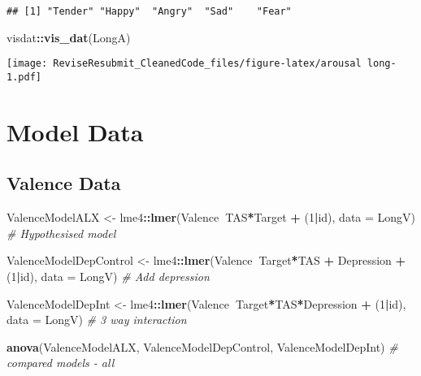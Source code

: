\documentclass[]{article}
\newenvironment{Shaded}{\begin{snugshade}}{\end{snugshade}}
\newcommand{\CommentTok}[1]{\textcolor[rgb]{0.56,0.35,0.01}{\textit{#1}}}
\newcommand{\DataTypeTok}[1]{\textcolor[rgb]{0.13,0.29,0.53}{#1}}
\newcommand{\DecValTok}[1]{\textcolor[rgb]{0.00,0.00,0.81}{#1}}
\newcommand{\KeywordTok}[1]{\textcolor[rgb]{0.13,0.29,0.53}{\textbf{#1}}}
\newcommand{\NormalTok}[1]{#1}
\newcommand{\OperatorTok}[1]{\textcolor[rgb]{0.81,0.36,0.00}{\textbf{#1}}}
\newcommand{\StringTok}[1]{\textcolor[rgb]{0.31,0.60,0.02}{#1}}
\begin{document}
\begin{verbatim}
## [1] "Tender" "Happy"  "Angry"  "Sad"    "Fear"
\end{verbatim}

\begin{Shaded}
\begin{Highlighting}[]
\NormalTok{visdat}\OperatorTok{::}\KeywordTok{vis_dat}\NormalTok{(LongA)}
\end{Highlighting}
\end{Shaded}

\texttt{[image: ReviseResubmit\_CleanedCode\_files/figure-latex/arousal long-1.pdf]}

\hypertarget{model-data}{%
\section{Model Data}\label{model-data}}

\hypertarget{valence-data}{%
\subsection{Valence Data}\label{valence-data}}

\begin{Shaded}
\begin{Highlighting}[]
\NormalTok{ValenceModelALX <-}\StringTok{ }\NormalTok{lme4}\OperatorTok{::}\KeywordTok{lmer}\NormalTok{(Valence}\OperatorTok{~}\NormalTok{TAS}\OperatorTok{*}\NormalTok{Target }\OperatorTok{+}\StringTok{ }\NormalTok{(}\DecValTok{1}\OperatorTok{|}\NormalTok{id), }\DataTypeTok{data =}\NormalTok{ LongV) }\CommentTok{# Hypothesised model }

\NormalTok{ValenceModelDepControl <-}\StringTok{ }\NormalTok{lme4}\OperatorTok{::}\KeywordTok{lmer}\NormalTok{(Valence}\OperatorTok{~}\NormalTok{Target}\OperatorTok{*}\NormalTok{TAS }\OperatorTok{+}\StringTok{ }\NormalTok{Depression }\OperatorTok{+}\StringTok{ }\NormalTok{(}\DecValTok{1}\OperatorTok{|}\NormalTok{id), }\DataTypeTok{data =}\NormalTok{ LongV) }\CommentTok{# Add depression}

\NormalTok{ValenceModelDepInt <-}\StringTok{ }\NormalTok{lme4}\OperatorTok{::}\KeywordTok{lmer}\NormalTok{(Valence}\OperatorTok{~}\NormalTok{Target}\OperatorTok{*}\NormalTok{TAS}\OperatorTok{*}\NormalTok{Depression }\OperatorTok{+}\StringTok{ }\NormalTok{(}\DecValTok{1}\OperatorTok{|}\NormalTok{id), }\DataTypeTok{data =}\NormalTok{ LongV) }\CommentTok{# 3 way interaction }

\KeywordTok{anova}\NormalTok{(ValenceModelALX, ValenceModelDepControl, ValenceModelDepInt) }\CommentTok{# compared models - all }
\end{Highlighting}
\end{Shaded}
\end{document}
